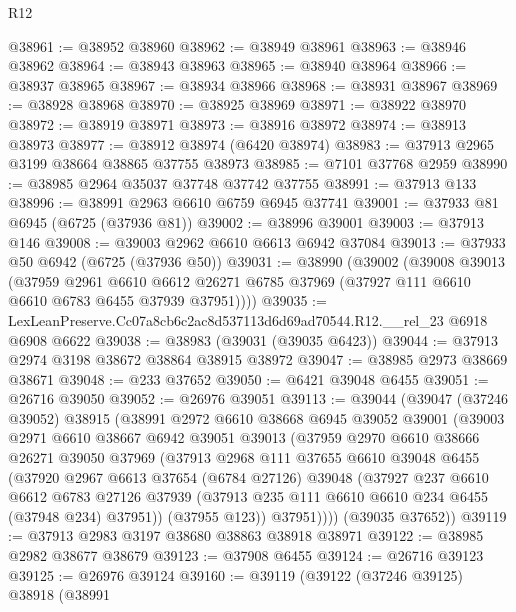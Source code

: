 \begin{lexlean}{R12}
\begin{coremodule}
@38961 := @38952 @38960
@38962 := @38949 @38961
@38963 := @38946 @38962
@38964 := @38943 @38963
@38965 := @38940 @38964
@38966 := @38937 @38965
@38967 := @38934 @38966
@38968 := @38931 @38967
@38969 := @38928 @38968
@38970 := @38925 @38969
@38971 := @38922 @38970
@38972 := @38919 @38971
@38973 := @38916 @38972
@38974 := @38913 @38973
@38977 := @38912 @38974 (@6420 @38974)
@38983 := @37913 @2965 @3199 @38664 @38865 @37755 @38973
@38985 := @7101 @37768 @2959
@38990 := @38985 @2964 @35037 @37748 @37742 @37755
@38991 := @37913 @133
@38996 := @38991 @2963 @6610 @6759 @6945 @37741
@39001 := @37933 @81 @6945 (@6725 (@37936 @81))
@39002 := @38996 @39001
@39003 := @37913 @146
@39008 := @39003 @2962 @6610 @6613 @6942 @37084
@39013 := @37933 @50 @6942 (@6725 (@37936 @50))
@39031 := @38990
    (@39002
      (@39008
        @39013
        (@37959
          @2961
          @6610
          @6612
          @26271
          @6785
          @37969
          (@37927 @111 @6610 @6610 @6783 @6455 @37939 @37951))))
@39035 := LexLeanPreserve.Cc07a8cb6c2ac8d537113d6d69ad70544.R12.__rel_23 @6918 @6908 @6622
@39038 := @38983 (@39031 (@39035 @6423))
@39044 := @37913 @2974 @3198 @38672 @38864 @38915 @38972
@39047 := @38985 @2973 @38669 @38671
@39048 := @233 @37652
@39050 := @6421 @39048 @6455
@39051 := @26716 @39050
@39052 := @26976 @39051
@39113 := @39044
    (@39047
      (@37246 @39052)
      @38915
      (@38991
        @2972
        @6610
        @38668
        @6945
        @39052
        @39001
        (@39003
          @2971
          @6610
          @38667
          @6942
          @39051
          @39013
          (@37959
            @2970
            @6610
            @38666
            @26271
            @39050
            @37969
            (@37913
              @2968
              @111
              @37655
              @6610
              @39048
              @6455
              (@37920
                @2967
                @6613
                @37654
                (@6784 @27126)
                @39048
                (@37927
                  @237
                  @6610
                  @6612
                  @6783
                  @27126
                  @37939
                  (@37913 @235 @111 @6610 @6610 @234 @6455 (@37948 @234) @37951))
                (@37955 @123))
              @37951))))
      (@39035 @37652))
@39119 := @37913 @2983 @3197 @38680 @38863 @38918 @38971
@39122 := @38985 @2982 @38677 @38679
@39123 := @37908 @6455
@39124 := @26716 @39123
@39125 := @26976 @39124
@39160 := @39119
    (@39122
      (@37246 @39125)
      @38918
      (@38991

\end{coremodule}
\end{lexlean}
